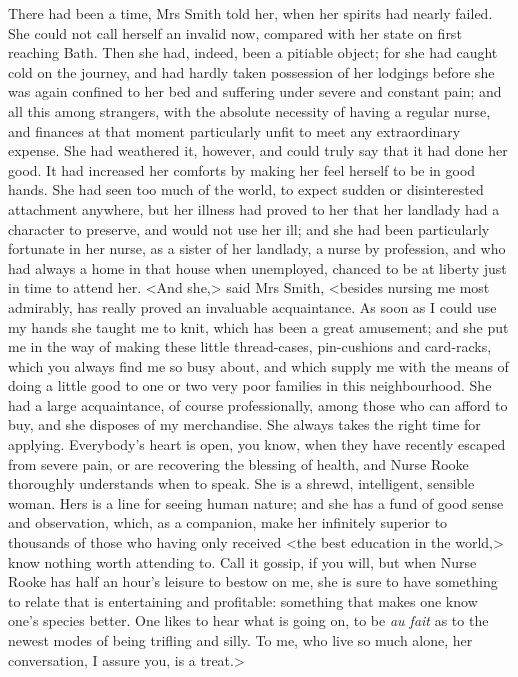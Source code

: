 There had been a time, Mrs Smith told her, when her spirits had nearly failed. She could not call herself an invalid now, compared with her state on first reaching Bath. Then she had, indeed, been a pitiable object; for she had caught cold on the journey, and had hardly taken possession of her lodgings before she was again confined to her bed and suffering under severe and constant pain; and all this among strangers, with the absolute necessity of having a regular nurse, and finances at that moment particularly unfit to meet any extraordinary expense. She had weathered it, however, and could truly say that it had done her good. It had increased her comforts by making her feel herself to be in good hands. She had seen too much of the world, to expect sudden or disinterested attachment anywhere, but her illness had proved to her that her landlady had a character to preserve, and would not use her ill; and she had been particularly fortunate in her nurse, as a sister of her landlady, a nurse by profession, and who had always a home in that house when unemployed, chanced to be at liberty just in time to attend her. <And she,> said Mrs Smith, <besides nursing me most admirably, has really proved an invaluable acquaintance. As soon as I could use my hands she taught me to knit, which has been a great amusement; and she put me in the way of making these little thread-cases, pin-cushions and card-racks, which you always find me so busy about, and which supply me with the means of doing a little good to one or two very poor families in this neighbourhood. She had a large acquaintance, of course professionally, among those who can afford to buy, and she disposes of my merchandise. She always takes the right time for applying. Everybody's heart is open, you know, when they have recently escaped from severe pain, or are recovering the blessing of health, and Nurse Rooke thoroughly understands when to speak. She is a shrewd, intelligent, sensible woman. Hers is a line for seeing human nature; and she has a fund of good sense and observation, which, as a companion, make her infinitely superior to thousands of those who having only received <the best education in the world,> know nothing worth attending to. Call it gossip, if you will, but when Nurse Rooke has half an hour's leisure to bestow on me, she is sure to have something to relate that is entertaining and profitable: something that makes one know one's species better. One likes to hear what is going on, to be \textit{au fait} as to the newest modes of being trifling and silly. To me, who live so much alone, her conversation, I assure you, is a treat.>

